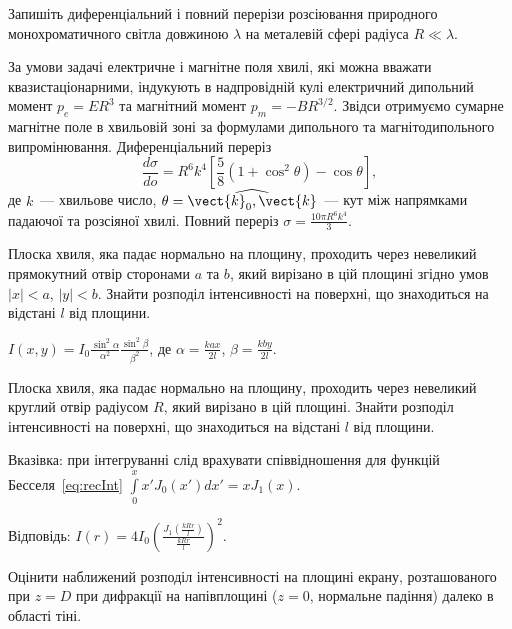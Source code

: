 \begin{problem}
Запишіть диференціальний і повний перерізи розсіювання природного монохроматичного світла довжиною $\lambda$ на металевій сфері радіуса $R \ll \lambda$.
\begin{solution}
    За умови задачі  електричне і магнітне поля хвилі, які можна вважати квазистаціонарними, індукують в надпровідній кулі електричний дипольний момент $p_e=ER^3$ та магнітний момент $p_m=-BR^{3/2}$. Звідси отримуємо сумарне магнітне поле в хвильовій зоні за формулами дипольного та магнітодипольного випромінювання.
	Диференціальний переріз
	\[
		\frac{d\sigma}{do} = R^6 k^4 \left[\frac58 (1 + \cos^2\theta) -\cos\theta\right],
	\]
	де $k$~--- хвильове число, $\theta = \widehat{\vect{k}_0,\vect{k}}$~--- кут між напрямками падаючої та розсіяної хвилі.
	Повний переріз $\sigma = \frac{10\pi R^6 k^4}{3}$.
\end{solution}
\end{problem}


\begin{problem}
Плоска хвиля, яка падає нормально на площину, проходить через невеликий прямокутний отвір сторонами $a$ та $b$, який вирізано в цій площині згідно умов $|x|< a$, $|y|<b$. Знайти розподіл інтенсивності на поверхні, що знаходиться на відстані $l$ від площини.
\begin{solution}
	$I(x,y) = I_0\frac{\sin^2\alpha}{\alpha^2}\frac{\sin^2\beta}{\beta^2}$, де $\alpha = \frac{kax}{2l}$, $\beta=\frac{kby}{2l}$.
\end{solution}
\end{problem}

\begin{problem}
Плоска хвиля, яка падає нормально на площину, проходить через невеликий круглий отвір радіусом $R$, який вирізано в цій площині. Знайти розподіл інтенсивності на поверхні, що знаходиться на відстані $l$ від площини.
\begin{solution}
    Вказівка: при інтегруванні слід врахувати співвідношення для функцій Бесселя~\eqref{eq:recInt} $\int\limits_0^x x'J_0(x')dx' = xJ_1(x)$.

	Відповідь: $I(r) = 4I_0\left( \frac{J_1\left( \frac{kRr}{l}\right) }{\frac{kRr}{l}}\right)^2$.
\end{solution}
\end{problem}

\begin{problem}
Оцінити наближений розподіл інтенсивності на площині екрану, розташованого при $z = D$   при дифракції на напівплощині ($z = 0$, нормальне падіння) далеко в області тіні.
\end{problem}

